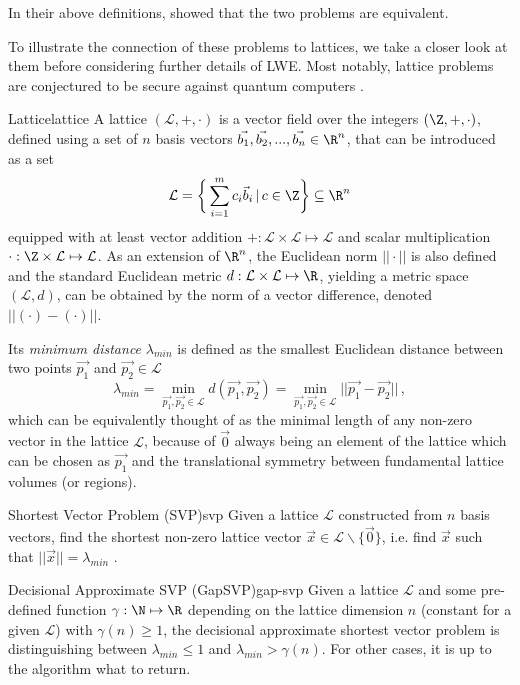 In their above definitions, \citeauthor{2005-lwe-original} showed that the two problems are equivalent.

To illustrate the connection of these problems to lattices, we
take a closer look at them before considering further details of LWE.
Most notably, lattice problems are conjectured to be secure against quantum computers \parencite{2018-lattice-problems}.

\newcommand{\lat}{\mathcal{L}}
\begin{definition}{Lattice}{lattice}
  A lattice $(\lat, +, \cdot)$ is a vector field over the integers $(\Z, +, \cdot)$, defined using a set of $n$
  basis vectors $\vec{b_1}, \vec{b_2}, ..., \vec{b_n} \in \R^n$, that can be introduced as a set
  $$\lat = \bigg\{\sum_{i=1}^m c_i \vec{b}_i \,|\, c \in \Z\bigg\} \subseteq \R^n$$
  equipped with at least vector addition $+: \lat \times \lat \mapsto \lat$
  and scalar multiplication $\cdot: \Z \times \lat \mapsto \lat$.
  As an extension of $\R^n$, the Euclidean norm $||\cdot||$ is also defined and
  the standard Euclidean metric $d: \lat \times \lat \mapsto \R$, yielding a metric space $(\lat, d)$,
  can be obtained by the norm of a vector difference, denoted $||(\cdot) - (\cdot)||$.
\end{definition}

Its \textit{minimum distance} $\lambda_{min}$ is defined as the smallest Euclidean distance
between two points $\vec{p_1}$ and $\vec{p_2} \in \lat$
$$\lambda_{min} = \min_{\vec{p_1}, \vec{p_2} \in \lat} d(\vec{p_1}, \vec{p_2}) =
  \min_{\vec{p_1}, \vec{p_2} \in \lat} ||\vec{p_1} - \vec{p_2}|| \,,$$
which can be equivalently thought of as the minimal length of any non-zero vector in the lattice $\lat$,
because of $\vec{0}$ always being an element of the lattice which can be chosen as $\vec{p_1}$
and the translational symmetry between fundamental lattice volumes (or regions).

\begin{definition}{Shortest Vector Problem (SVP)}{svp}
  Given a lattice $\lat$ constructed from $n$ basis vectors,
  find the shortest non-zero lattice vector $\vec{x} \in \lat \backslash \{\vec{0}\}$,
  i.e. find $\vec{x}$ such that $||\vec{x}|| = \lambda_{min}$ \parencite{2016-decade-of-lattice}.
\end{definition}

\begin{definition}{Decisional Approximate SVP (GapSVP)}{gap-svp}
  Given a lattice $\lat$ and some pre-defined function $\gamma: \N \mapsto \R$ depending
  on the lattice dimension $n$ (constant for a given $\lat$) with $\gamma(n) \geq 1$,
  the decisional approximate shortest vector problem is distinguishing
  between $\lambda_{min} \leq 1$ and $\lambda_{min} > \gamma(n)$.
  For other cases, it is up to the algorithm what to return.
\end{definition}

